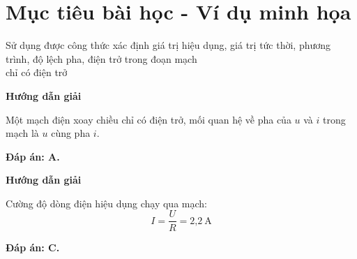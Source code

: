 \section{Mục tiêu bài học - Ví dụ minh họa}
\begin{dang}{Sử dụng được công thức xác định giá trị hiệu dụng, giá trị tức thời, phương trình, độ lệch pha, điện trở trong đoạn mạch\\ chỉ có điện trở}
	
	
	{\begin{center}
			\textbf{Hướng dẫn giải}
		\end{center}
		
		Một mạch điện xoay chiều chỉ có điện trở, mối quan hệ về pha của $u$ và $i$ trong mạch là $u$ cùng pha $i$.
		
		\textbf{Đáp án: A.}
	}
	
	{\begin{center}
			\textbf{Hướng dẫn giải}
		\end{center}
		
		
		Cường độ dòng điện hiệu dụng chạy qua mạch:
		$$I=\dfrac{U}{R} = \text{2,2}\ \text{A}$$
		
		
		
		\textbf{Đáp án: C.}
	}
	
\end{dang}

